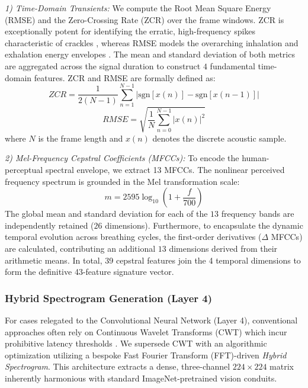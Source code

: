 \textit{1) Time-Domain Transients:} We compute the Root Mean Square Energy (RMSE) and the Zero-Crossing Rate (ZCR) over the frame windows. ZCR is exceptionally potent for identifying the erratic, high-frequency spikes characteristic of crackles \cite{b20,b21}, whereas RMSE models the overarching inhalation and exhalation energy envelopes \cite{b19}. The mean and standard deviation of both metrics are aggregated across the signal duration to construct $4$ fundamental time-domain features. ZCR and RMSE are formally defined as:
\begin{equation}
ZCR = \frac{1}{2(N-1)} \sum_{n=1}^{N-1} \left| \text{sgn}[x(n)] - \text{sgn}[x(n-1)] \right|
\end{equation}
\begin{equation}
RMSE = \sqrt{\frac{1}{N} \sum_{n=0}^{N-1} |x(n)|^2}
\end{equation}
where $N$ is the frame length and $x(n)$ denotes the discrete acoustic sample.

\textit{2) Mel-Frequency Cepstral Coefficients (MFCCs):} To encode the human-perceptual spectral envelope, we extract 13 MFCCs. The nonlinear perceived frequency spectrum is grounded in the Mel transformation scale:
\begin{equation}
m = 2595 \log_{10} \left( 1 + \frac{f}{700} \right)
\end{equation}
The global mean and standard deviation for each of the $13$ frequency bands are independently retained ($26$ dimensions). Furthermore, to encapsulate the dynamic temporal evolution across breathing cycles, the first-order derivatives ($\Delta$ MFCCs) are calculated, contributing an additional $13$ dimensions derived from their arithmetic means. In total, 39 cepstral features join the 4 temporal dimensions to form the definitive 43-feature signature vector.

\subsubsection{Hybrid Spectrogram Generation (Layer 4)}
For cases relegated to the Convolutional Neural Network (Layer 4), conventional approaches often rely on Continuous Wavelet Transforms (CWT) which incur prohibitive latency thresholds \cite{b27}. We supersede CWT with an algorithmic optimization utilizing a bespoke Fast Fourier Transform (FFT)-driven \textit{Hybrid Spectrogram}. This architecture extracts a dense, three-channel $224 \times 224$ matrix inherently harmonious with standard ImageNet-pretrained vision conduits. 

